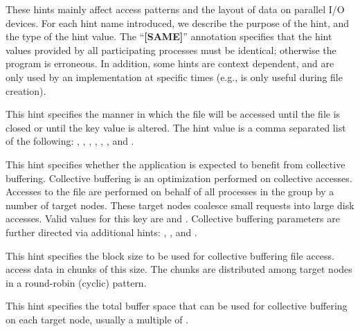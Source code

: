 These hints mainly affect access patterns
and the layout of data on parallel I/O devices.
For each hint name introduced, we
describe the purpose of the hint, and the type of the hint value.
The ``\textbf{[SAME]}'' annotation specifies that the hint values
provided by all participating processes must be identical;
otherwise the program is erroneous.
In addition, some hints are context dependent,
and are only used by an implementation at specific times
(e.g.,  is only useful during file creation).

\begin{description}

{\sloppy   %
\item[\infokeymain{access\_style} (comma separated list of strings):]
This hint specifies the manner in which the file will be
accessed until the file is closed
or until the  key value is altered.
The hint value is a comma separated list of the following:
, ,
, ,
, ,
and .

}
\item[\infokeymain{collective\_buffering} (boolean) {[SAME]}:]
This hint specifies whether the application is expected to benefit
from collective buffering.
Collective buffering is an optimization performed on collective accesses.
Accesses to the file are performed on behalf of all processes in the group
by a number of target nodes.
These target nodes coalesce small requests into large disk accesses.
Valid values for this key are  and .
Collective buffering parameters are further directed via
additional hints: ,
, and .

\item[\infokeymain{cb\_block\_size} (integer) {[SAME]}:]
This hint specifies the block size to be used
for collective buffering file access.
access data in chunks of this size.
The chunks are distributed among target nodes
in a round-robin (cyclic) pattern.

\item[\infokeymain{cb\_buffer\_size} (integer) {[SAME]}:]
This hint specifies the total buffer space that can be used
for collective buffering on each target node,
usually a multiple of .


\end{description}
